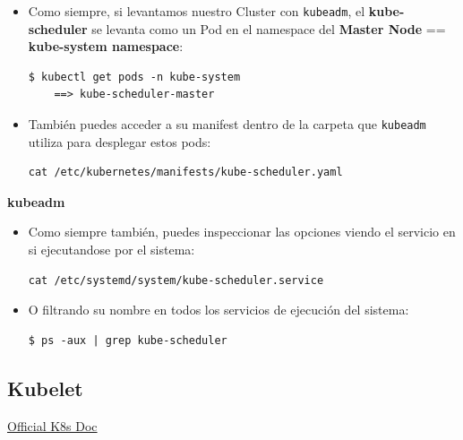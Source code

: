 \documentclass{article}
\newenvironment{codetemplate}[1][]{%
  \mybasecolorbox[#1]
  \itshape
}{%
  \endmybasecolorbox
}
\begin{document}
\begin{itemize}
    \item Como siempre, si levantamos nuestro Cluster con \verb|kubeadm|, el \textbf{kube-scheduler} se levanta como un Pod en el namespace del \textbf{Master Node} == \textbf{kube-system namespace}:
\begin{codetemplate}{}
\begin{verbatim}
$ kubectl get pods -n kube-system
    ==> kube-scheduler-master
\end{verbatim}
\end{codetemplate}

    \item También puedes acceder a su manifest dentro de la carpeta que \verb|kubeadm| utiliza para desplegar estos pods:
\begin{codetemplate}{}
\begin{verbatim}
cat /etc/kubernetes/manifests/kube-scheduler.yaml
\end{verbatim}
\end{codetemplate}
\end{itemize}

\textbf{kubeadm}

\begin{itemize}
    \item Como siempre también, puedes inspeccionar las opciones viendo el servicio en si ejecutandose por el sistema:
\begin{codetemplate}{}
\begin{verbatim}
cat /etc/systemd/system/kube-scheduler.service
\end{verbatim}
\end{codetemplate}

    \item O filtrando su nombre en todos los servicios de ejecución del sistema:
\begin{codetemplate}{}
\begin{verbatim}
$ ps -aux | grep kube-scheduler
\end{verbatim}
\end{codetemplate}
\end{itemize}

\subsection{Kubelet}

\href{https://kubernetes.io/docs/reference/command-line-tools-reference/kubelet/}{Official K8s Doc}
\end{document}
